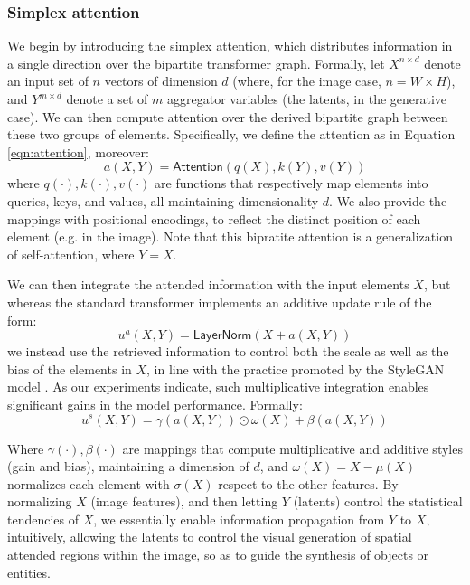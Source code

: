 \documentclass{article}
\begin{document}
	\subsubsection{Simplex attention}
	We begin by introducing the simplex attention, which distributes information in a single direction 
	over the bipartite transformer graph. Formally, let $X^{n\times d}$ denote an input set of $n$ 
	vectors of dimension $d$ (where, for the image case, $n = W\times H$), and $Y^{m\times d}$ 
	denote a set of $m$ aggregator variables (the latents, in the generative case). We can then compute 
	attention over the derived bipartite graph between these two groups of elements. Specifically, we 
	define the attention as in Equation \eqref{eqn:attention}, moreover:
	\begin{equation}
		\label{eqn:attention2}
		a(X,Y)=\mathsf{Attention}(q(X), k(Y), v(Y))
	\end{equation}
	where $q(\cdot), k(\cdot), v(\cdot)$ are functions that respectively map elements into queries, 
	keys, and values, all maintaining dimensionality $d$. We also provide the mappings with positional 
	encodings, to reflect the distinct position of each element (e.g. in the image). Note that this bipratite 
	attention is a generalization of self-attention, where $Y = X$.
	
	We can then integrate the attended information with the input elements $X$, but whereas the 
	standard transformer implements an additive update rule of the form:
	\begin{equation}
		\label{eqn:layernorm}
		u^a(X, Y )=\mathsf{LayerNorm}(X + a(X, Y ))
	\end{equation}
	we instead use the retrieved information to control both the scale as well as the bias of the elements 
	in $X$, in line with the practice promoted by the StyleGAN model \cite{karras2019style}. As our 
	experiments indicate, such multiplicative integration enables significant gains in the model 
	performance. Formally:
	\begin{equation}
		\label{eqn:simplex}
		u^s(X, Y )=\gamma (a(X, Y )) \odot \omega (X) + \beta (a(X, Y ))
	\end{equation}

	Where $\gamma(\cdot), \beta(\cdot)$ are mappings that compute multiplicative and additive styles 
	(gain and bias), maintaining a dimension of $d$, and $\omega (X) = X- \mu(X)$ normalizes each 
	element with $\sigma(X)$ respect to the other features. By normalizing $X$ (image features), and 
	then letting $Y$ (latents) control the statistical tendencies of $X$, we essentially enable information 
	propagation from $Y$ to $X$, intuitively, allowing the latents to control the visual generation of 
	spatial attended regions within the image, so as to guide the synthesis of objects or entities.
	
\end{document}
